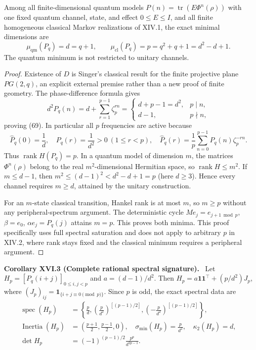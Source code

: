 \documentclass[11pt,a4paper,oneside]{book}
\newcommand{\one}{\mathbf 1}\newcommand{\ii}{\mathrm i}\newcommand{\dd}{\mathrm d}
\DeclareMathOperator{\rank}{rank}\DeclareMathOperator{\Tr}{Tr}
\DeclareMathOperator{\spec}{spec}\DeclareMathOperator{\diag}{diag}
\newcommand{\statement}[3]{\par\medskip\noindent\textbf{#1 #2 (#3).}\ }
\begin{document}
Among all finite-dimensional quantum models $P(n)=\operatorname{tr}(E\Phi^n(\rho))$ with one fixed quantum channel, state, and effect $0\le E\le I$, and all finite homogeneous classical Markov realizations of XIV.1, the exact minimal dimensions are
\begin{equation}\mu_{\mathrm{qm}}(P_q)=d=q+1,\qquad\mu_{\mathrm{cl}}(P_q)=p=q^2+q+1=d^2-d+1.\tag{70}\end{equation}
The quantum minimum is not restricted to unitary channels.
\begin{proof}Existence of $D$ is Singer's classical result for the finite projective plane $PG(2,q)$, an explicit external premise rather than a new proof of finite geometry. The phase-difference formula gives
\[d^2P_q(n)=d+\sum_{r=1}^{p-1}\zeta_p^{rn}=\begin{cases}d+p-1=d^2,&p\mid n,\\d-1,&p\nmid n,\end{cases}\]
proving (69). In particular all $p$ frequencies are active because
\begin{equation}\widehat P_q(0)=\frac1d,\quad\widehat P_q(r)=\frac1{d^2}>0\ (1\le r<p),\quad\widehat P_q(r)=\frac1p\sum_{n=0}^{p-1}P_q(n)\zeta_p^{-rn}.\tag{71}\end{equation}
Thus $\rank H(P_q)=p$. In a quantum model of dimension $m$, the matrices $\Phi^n(\rho)$ belong to the real $m^2$-dimensional Hermitian space, so $\rank H\le m^2$. If $m\le d-1$, then $m^2\le(d-1)^2<d^2-d+1=p$ (here $d\ge3$). Hence every channel requires $m\ge d$, attained by the unitary construction.

For an $m$-state classical transition, Hankel rank is at most $m$, so $m\ge p$ without any peripheral-spectrum argument. The deterministic cycle $Me_j=e_{j+1\bmod p}$, $\beta=e_0$, $\alpha e_j=P_q(j)$ attains $m=p$. This proves both minima. This proof specifically uses full spectral saturation and does not apply to arbitrary $p$ in XIV.2, where rank stays fixed and the classical minimum requires a peripheral argument.\end{proof}
\statement{Corollary}{XVI.3}{Complete rational spectral signature} Let $H_p=[P_q(i+j)]_{0\le i,j<p}$ and $a=(d-1)/d^2$. Then $H_p=a\one\one^\top+(p/d^2)J_p$, where $(J_p)_{ij}=\one_{\{i+j\equiv0\pmod p\}}$. Since $p$ is odd, the exact spectral data are
\begin{align}\spec(H_p)&=\left\{\frac pd,\left(\frac p{d^2}\right)^{[(p-1)/2]},\left(-\frac p{d^2}\right)^{[(p-1)/2]}\right\},\tag{72}\\
\operatorname{Inertia}(H_p)&=\left(\frac{p+1}2,\frac{p-1}2,0\right),\quad\sigma_{\min}(H_p)=\frac p{d^2},\quad\kappa_2(H_p)=d,\tag{73}\\
\det H_p&=(-1)^{(p-1)/2}\frac{p^p}{d^{2p-1}}.\tag{74}\end{align}
\end{document}
